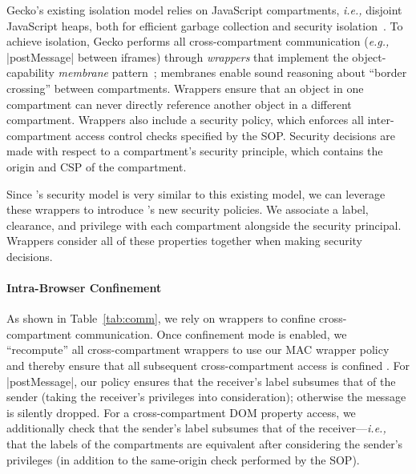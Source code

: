 Gecko's existing isolation model relies on JavaScript compartments, \emph{i.e.,}
disjoint JavaScript heaps, both for efficient garbage collection and
security isolation~\cite{wagner2011compartmental}.
%
To achieve isolation, Gecko performs all cross-compartment
communication (\emph{e.g.,} \js|postMessage| between iframes) through
\emph{wrappers} that implement the object-capability \emph{membrane}
pattern~\cite{miller2003paradigm,miller2006robust}; membranes enable
sound reasoning about ``border crossing'' between compartments. 
%
Wrappers ensure that an object in one compartment can
never directly reference another object in a different compartment.
Wrappers also include a security policy,
which enforces all inter-compartment access control checks
specified by the SOP\@.
%
Security decisions are made with respect to a compartment's
security principle, which contains the origin and CSP of the compartment.

Since \sys{}'s security model is very similar to this existing
model, we can leverage these wrappers to introduce \sys{}'s new
security policies.
%
We associate a label, clearance, and privilege with each compartment
alongside the security principal.
%
Wrappers consider all of these properties together when making
security decisions.

\paragraph{Intra-Browser Confinement}
%
As shown in Table~\ref{tab:comm}, we rely on wrappers to
confine cross-compartment communication.
%
Once confinement mode is enabled, we ``recompute'' all
cross-compartment wrappers to use our MAC wrapper policy and thereby
ensure that all subsequent cross-compartment access is confined .
%
%
For \js|postMessage|, our policy ensures that the receiver's label
subsumes that of the sender (taking the receiver's privileges into
consideration); otherwise the message is silently dropped.
%
For a cross-compartment DOM property access, we additionally check
that the sender's label subsumes that of the receiver---\emph{i.e.,}
that the labels of the compartments are equivalent after considering
the sender's privileges (in addition to the same-origin check
performed by the SOP).

